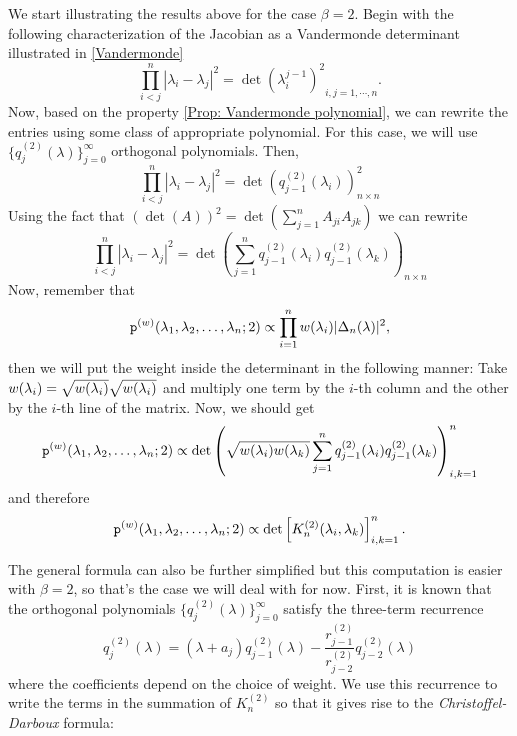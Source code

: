 We start illustrating the results above for the case $\beta=2$. Begin with the following characterization of the Jacobian as a Vandermonde determinant illustrated in \ref{Vandermonde}
\begin{equation}
	\prod_{i<j}^{n} |\lambda_i - \lambda_j|^2 = {\det(\lambda_i^{j-1})^2}_{i,j=1,\cdots,n}.
\end{equation}
Now, based on the property \ref{Prop: Vandermonde polynomial}, we can rewrite the entries using some class of appropriate polynomial. For this case, we will use $\{q_j^{(2)}(\lambda)\}_{j=0}^\infty$ orthogonal polynomials. Then,
\begin{equation}
	\prod_{i<j}^{n} |\lambda_i - \lambda_j|^2 = {\det\left(q_{j-1}^{(2)}(\lambda_i)\right)}^2_{n\times n}
\end{equation}
Using the fact that $(\det(A))^2 = \det(\sum_{j=1}^{n} A_{ji} A_{jk})$ we can rewrite
\begin{equation}
	\prod_{i<j}^{n} |\lambda_i - \lambda_j|^2 = {\det\left(\sum_{j=1}^{n} q_{j-1}^{(2)}(\lambda_i) q_{j-1}^{(2)}(\lambda_k) \right)}_{n\times n}
\end{equation}
Now, remember that
\begin{equation}
	\mathtt{p}^{(w)}(\lambda_1, \lambda_2, \dots, \lambda_n;2) \propto \prod_{i=1}^{n} w(\lambda_i) |\Delta_n(\lambda)|^2,
\end{equation}
then we will put the weight inside the determinant in the following manner: Take $w(\lambda_i) = \sqrt{w(\lambda_i)}\sqrt{w(\lambda_i)}$ and multiply one term by the $i$-th column and the other by the $i$-th line of the matrix. Now, we should get
\begin{equation}
	\mathtt{p}^{(w)}(\lambda_1, \lambda_2, \dots, \lambda_n;2) \propto {\det\left(\sqrt{w(\lambda_i)w(\lambda_k)} \sum_{j=1}^{n} q_{j-1}^{(2)}(\lambda_i) q_{j-1}^{(2)}(\lambda_k) \right)}_{i,k=1}^{n}
\end{equation}
and therefore
\begin{equation}
	\mathtt{p}^{(w)}(\lambda_1, \lambda_2, \dots, \lambda_n;2) \propto \det\left[ K_n^{(2)}(\lambda_i, \lambda_k) \right]_{i,k=1}^{n}.
\end{equation}

The general formula can also be further simplified but this computation is easier with $\beta = 2$, so that's the case we will deal with for now. First, it is known that the orthogonal polynomials $\{q_j^{(2)}(\lambda)\}_{j=0}^\infty$ satisfy the three-term recurrence
\begin{equation}
	q_{j}^{(2)}(\lambda) = (\lambda + a_j) q_{j-1}^{(2)}(\lambda) - \frac{r_{j-1}^{(2)}}{r_{j-2}^{(2)}} q_{j-2}^{(2)}(\lambda)
\end{equation} 
where the coefficients depend on the choice of weight. We use this recurrence to write the terms in the summation of $K_n^{(2)}$ so that it gives rise to the \textit{Christoffel-Darboux} formula:


